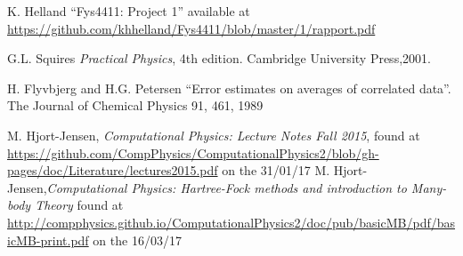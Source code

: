 \documentclass[a4paper,English,10pt]{article}
\begin{document}
\begin{thebibliography}{1}

  K. Helland ``Fys4411: Project 1'' available at \url{https://github.com/khhelland/Fys4411/blob/master/1/rapport.pdf}
  
  G.L. Squires \emph{Practical Physics}, 4th edition. Cambridge University Press,2001.
  
  H. Flyvbjerg and H.G. Petersen ``Error estimates on averages of correlated data''. The Journal of Chemical Physics 91, 461, 1989

  M. Hjort-Jensen, \emph{Computational Physics: Lecture Notes Fall 2015}, found at
  \url{https://github.com/CompPhysics/ComputationalPhysics2/blob/gh-pages/doc/Literature/lectures2015.pdf}
  on the 31/01/17
  M. Hjort-Jensen,\emph{Computational Physics: Hartree-Fock methods and introduction to Many-body Theory}
  found at \url{http://compphysics.github.io/ComputationalPhysics2/doc/pub/basicMB/pdf/basicMB-print.pdf}
  on the 16/03/17
\end{thebibliography}


      
      




\end{document}
